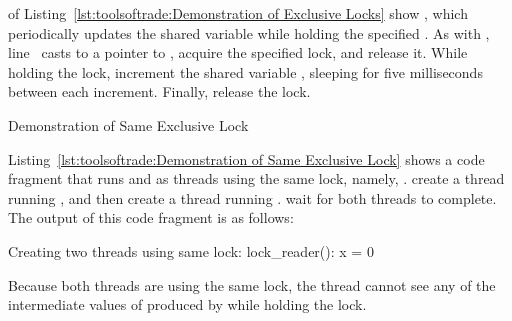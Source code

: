 \QuickQuizEnd

\begin{fcvref}
 of
Listing~\ref{lst:toolsoftrade:Demonstration of Exclusive Locks}
show , which
periodically updates the shared variable  while holding the
specified .
As with , line~ casts  to a pointer
to ,
 acquire the specified lock,
and  release it.
While holding the lock, 
increment the shared variable ,
sleeping for five milliseconds between each increment.
Finally,  release the lock.
\end{fcvref}

\begin{listing}[tbp]

\caption{Demonstration of Same Exclusive Lock}
\label{lst:toolsoftrade:Demonstration of Same Exclusive Lock}
\end{listing}

\begin{fcvref}
Listing~\ref{lst:toolsoftrade:Demonstration of Same Exclusive Lock}
shows a code fragment that runs  and
 as threads using the same lock, namely, .
 create a thread
running , and then
 create a thread
running .
 wait for both threads to complete.
The output of this code fragment is as follows:
\end{fcvref}

\begin{VerbatimU}
Creating two threads using same lock:
lock_reader(): x = 0
\end{VerbatimU}

Because both threads are using the same lock, the 
thread cannot see any of the intermediate values of  produced
by  while holding the lock.

